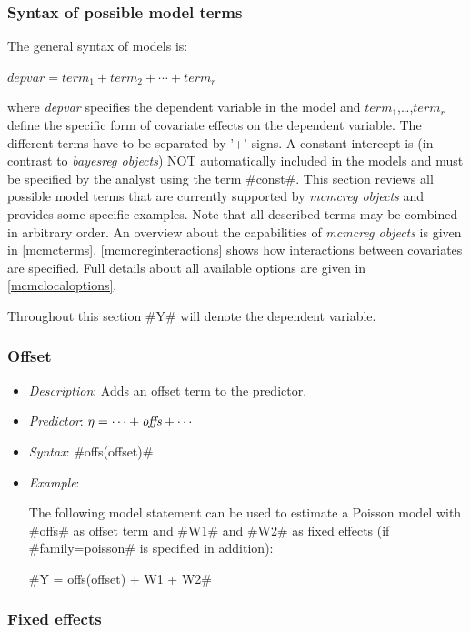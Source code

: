 \subsubsection{Syntax of possible model terms}
\label{mcmcregmodelsyntax}

The general syntax of models is:

$depvar = term_1 + term_2 + \cdots + term_r$

where {\em depvar} specifies the dependent variable in the model
and $term_1$,\dots,$term_r$ define the specific form of covariate
effects on the dependent variable. The different terms have to be
separated by '+' signs. A constant intercept is (in contrast to
{\em bayesreg objects}) NOT automatically
included in the models and must be specified by the
analyst using the term #const#. This section reviews all possible model terms that are
currently supported by {\em mcmcreg objects} and provides some
specific examples. Note that all described terms may be combined
in arbitrary order. An overview about the capabilities of {\em
mcmcreg objects} is given in \autoref{mcmcterms}.
\autoref{mcmcreginteractions} shows how interactions between
covariates are specified. Full details about all available options
are given in \autoref{mcmclocaloptions}.

Throughout this section #Y# will denote the dependent variable.

\subsubsection*{Offset}

\begin{itemize}
\item[] {\em Description}: Adds an offset term to the predictor.
\item[] {\em Predictor}: $\eta =  \cdots + \mbox{\it offs} + \cdots$
\item[] {\em Syntax}: #offs(offset)#
\item[] {\em Example}:

The following model statement can be used to estimate a Poisson
model with #offs# as offset term and #W1# and #W2# as fixed
effects (if #family=poisson# is specified in addition):

#Y = offs(offset) + W1 + W2#

\end{itemize}

\subsubsection*{Fixed effects}

